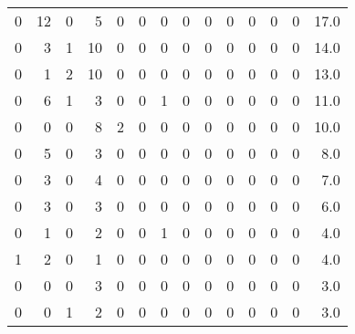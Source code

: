 \begin{tabular}{rrrrrrrrrrrrrr}
       0 &      12 &          0 &               5 &                0 &       0 &          0 &          0 &         0 &         0 &      0 &             0 &         0 &     17.0 \\
       0 &       3 &          1 &              10 &                0 &       0 &          0 &          0 &         0 &         0 &      0 &             0 &         0 &     14.0 \\
       0 &       1 &          2 &              10 &                0 &       0 &          0 &          0 &         0 &         0 &      0 &             0 &         0 &     13.0 \\
       0 &       6 &          1 &               3 &                0 &       0 &          1 &          0 &         0 &         0 &      0 &             0 &         0 &     11.0 \\
       0 &       0 &          0 &               8 &                2 &       0 &          0 &          0 &         0 &         0 &      0 &             0 &         0 &     10.0 \\
       0 &       5 &          0 &               3 &                0 &       0 &          0 &          0 &         0 &         0 &      0 &             0 &         0 &      8.0 \\
       0 &       3 &          0 &               4 &                0 &       0 &          0 &          0 &         0 &         0 &      0 &             0 &         0 &      7.0 \\
       0 &       3 &          0 &               3 &                0 &       0 &          0 &          0 &         0 &         0 &      0 &             0 &         0 &      6.0 \\
       0 &       1 &          0 &               2 &                0 &       0 &          1 &          0 &         0 &         0 &      0 &             0 &         0 &      4.0 \\
       1 &       2 &          0 &               1 &                0 &       0 &          0 &          0 &         0 &         0 &      0 &             0 &         0 &      4.0 \\
       0 &       0 &          0 &               3 &                0 &       0 &          0 &          0 &         0 &         0 &      0 &             0 &         0 &      3.0 \\
       0 &       0 &          1 &               2 &                0 &       0 &          0 &          0 &         0 &         0 &      0 &             0 &         0 &      3.0 \\

\end{tabular}
